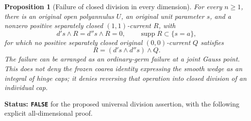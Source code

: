 \documentclass[11pt,a4paper]{article}
\numberwithin{equation}{section}
\newtheorem{proposition}[theorem]{Proposition}
\theoremstyle{definition}
\theoremstyle{remark}
\begin{document}
\begin{proposition}[Failure of closed division in every dimension]
\label{prop:r12-no-closed-conormal-division}
For every \(n\ge1\), there is an original open polyannulus \(U\),
an original unit parameter \(s\), and a nonzero positive separately
closed \((1,1)\)-current \(R\), with
\[
       d's\wedge R=d''s\wedge R=0,\qquad
       \operatorname{supp}R\subset\{s=a\},
 \tag{CQ4}
\]
for which no positive separately closed original \((0,0)\)-current
\(Q\) satisfies
\[
                           R=(d's\wedge d''s)\wedge Q.
 \tag{CQ5}
\]
The failure can be arranged as an ordinary-germ failure at a joint
Gauss point. This does not deny the frozen coarea identity expressing
the smooth wedge as an integral of hinge caps; it denies reversing
that operation into closed division of an individual cap.
\end{proposition}

\noindent\textbf{Status: \texttt{FALSE}} for the proposed universal
division assertion, with the following explicit all-dimensional proof.
\end{document}
